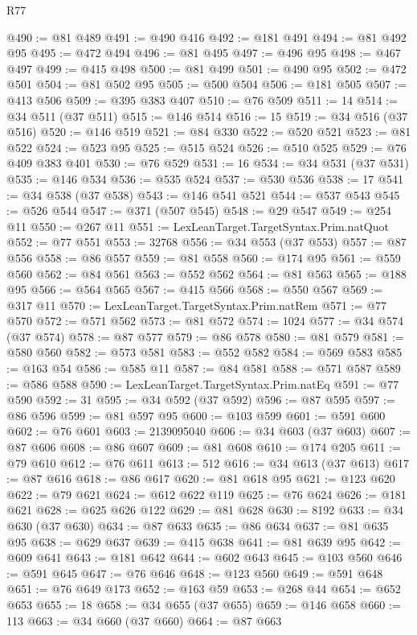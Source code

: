 \begin{lexlean}{R77}
\begin{coremodule}
@490 := @81 @489
@491 := @490 @416
@492 := @181 @491
@494 := @81 @492 @95
@495 := @472 @494
@496 := @81 @495
@497 := @496 @95
@498 := @467 @497
@499 := @415 @498
@500 := @81 @499
@501 := @490 @95
@502 := @472 @501
@504 := @81 @502 @95
@505 := @500 @504
@506 := @181 @505
@507 := @413 @506
@509 := @395 @383 @407
@510 := @76 @509
@511 := 14
@514 := @34 @511 (@37 @511)
@515 := @146 @514
@516 := 15
@519 := @34 @516 (@37 @516)
@520 := @146 @519
@521 := @84 @330
@522 := @520 @521
@523 := @81 @522
@524 := @523 @95
@525 := @515 @524
@526 := @510 @525
@529 := @76 @409 @383 @401
@530 := @76 @529
@531 := 16
@534 := @34 @531 (@37 @531)
@535 := @146 @534
@536 := @535 @524
@537 := @530 @536
@538 := 17
@541 := @34 @538 (@37 @538)
@543 := @146 @541 @521
@544 := @537 @543
@545 := @526 @544
@547 := @371 (@507 @545)
@548 := @29 @547
@549 := @254 @11
@550 := @267 @11
@551 := LexLeanTarget.TargetSyntax.Prim.natQuot
@552 := @77 @551
@553 := 32768
@556 := @34 @553 (@37 @553)
@557 := @87 @556
@558 := @86 @557
@559 := @81 @558
@560 := @174 @95
@561 := @559 @560
@562 := @84 @561
@563 := @552 @562
@564 := @81 @563
@565 := @188 @95
@566 := @564 @565
@567 := @415 @566
@568 := @550 @567
@569 := @317 @11
@570 := LexLeanTarget.TargetSyntax.Prim.natRem
@571 := @77 @570
@572 := @571 @562
@573 := @81 @572
@574 := 1024
@577 := @34 @574 (@37 @574)
@578 := @87 @577
@579 := @86 @578
@580 := @81 @579
@581 := @580 @560
@582 := @573 @581
@583 := @552 @582
@584 := @569 @583
@585 := @163 @54
@586 := @585 @11
@587 := @84 @581
@588 := @571 @587
@589 := @586 @588
@590 := LexLeanTarget.TargetSyntax.Prim.natEq
@591 := @77 @590
@592 := 31
@595 := @34 @592 (@37 @592)
@596 := @87 @595
@597 := @86 @596
@599 := @81 @597 @95
@600 := @103 @599
@601 := @591 @600
@602 := @76 @601
@603 := 2139095040
@606 := @34 @603 (@37 @603)
@607 := @87 @606
@608 := @86 @607
@609 := @81 @608
@610 := @174 @205
@611 := @79 @610
@612 := @76 @611
@613 := 512
@616 := @34 @613 (@37 @613)
@617 := @87 @616
@618 := @86 @617
@620 := @81 @618 @95
@621 := @123 @620
@622 := @79 @621
@624 := @612 @622 @119
@625 := @76 @624
@626 := @181 @621
@628 := @625 @626 @122
@629 := @81 @628
@630 := 8192
@633 := @34 @630 (@37 @630)
@634 := @87 @633
@635 := @86 @634
@637 := @81 @635 @95
@638 := @629 @637
@639 := @415 @638
@641 := @81 @639 @95
@642 := @609 @641
@643 := @181 @642
@644 := @602 @643
@645 := @103 @560
@646 := @591 @645
@647 := @76 @646
@648 := @123 @560
@649 := @591 @648
@651 := @76 @649 @173
@652 := @163 @59
@653 := @268 @44
@654 := @652 @653
@655 := 18
@658 := @34 @655 (@37 @655)
@659 := @146 @658
@660 := 113
@663 := @34 @660 (@37 @660)
@664 := @87 @663

\end{coremodule}
\end{lexlean}
